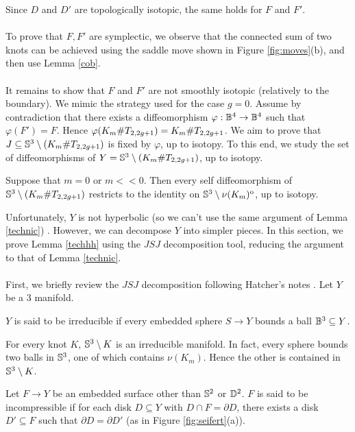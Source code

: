 Since $D$ and $D'$ are topologically isotopic, the same holds for $F$ and $F'$. \\ \\
To prove that $F, F'$ are symplectic, we observe that the connected sum of two knots can be achieved using the saddle move shown in Figure \ref{fig:moves}(b), and then use Lemma \ref{cob}.  \\ \\
It remains to show that $F$ and $F'$ are not smoothly isotopic (relatively to the boundary). We mimic the strategy used for the case $g=0$. 
Assume by contradiction that there exists a diffeomorphism $\varphi: \mathbb{B}^4 \rightarrow \mathbb{B}^4$ such that $\varphi(F') = F$. Hence $\varphi (K_m \# T_{2, 2g+1}) = K_m \# T_{2, 2g+1}$. 
We aim to prove that $J \subseteq \mathbb{S}^3 \setminus (K_m \# T_{2, 2g+1})$ is fixed by $\varphi$, up to isotopy. To this end, we study the set of diffeomorphisms of $Y = \mathbb{S}^3 \setminus (K_m \# T_{2, 2g+1})$, up to isotopy. 
\begin{lem} \label{techhh} Suppose that $m = 0$ or $m<<0$.
Then every self diffeomorphism of $\mathbb{S}^3 \setminus (K_m \# T_{2, 2g+1})$ restricts to the identity on $\mathbb{S}^3 \setminus \nu(K_m)^{\mathrm{o}}$, up to isotopy.
\end{lem}
Unfortunately, $Y$ is not hyperbolic (so we can't use the same argument of Lemma \ref{technic}) . However, we can decompose $Y$ into simpler pieces.
In this section, we prove Lemma \ref{techhh} using the $JSJ$ decomposition tool, reducing the argument to that of Lemma \ref{technic}.
\\ \\
First, we briefly review the $JSJ$ decomposition following Hatcher's notes \cite{hatcher2002notes}. Let $Y$ be a $3$ manifold. 
\begin{defn}$Y$ is said to be irreducible if every embedded sphere $S \rightarrow Y$ bounds a ball $\mathbb{B}^3 \subseteq Y$. 
\end{defn}
\begin{ex} For every knot $K$, $\mathbb{S}^3 \setminus K$ is an irreducible manifold. In fact, every sphere bounds two balls in $\mathbb{S}^3$, one of which contains $\nu(K_m)$. Hence the other is contained in $\mathbb{S}^3 \setminus K$.
\end{ex}
\begin{defn}Let $F \rightarrow Y$ be an embedded surface other than $\mathbb{S}^2$ or $\mathbb{D}^2$.
$F$ is said to be incompressible if for each disk $D \subseteq Y$ with $D \cap F = \partial D$, there exists a disk $D' \subseteq F$ such that $\partial D = \partial D'$ (as in Figure \ref{fig:seifert}(a)).
\end{defn}
